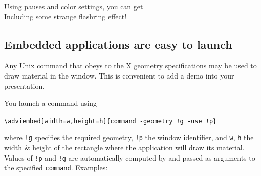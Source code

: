 \documentclass[12pt]{article}
\begin{document}
\noindent
Using pauses and color settings, you can get
\textcolor{red}{}\adviwait
{}
\textcolor{c2}{}\adviwait
{}
\textcolor{c3}{}\adviwait
{}
\textcolor{c4}{}\adviwait
{}
\textcolor{c5}{}\adviwait
{}
\textcolor{c6}{}\adviwait
{}\\
\textcolor{red}{}\adviwait
Including some strange flashring effect!
\textcolor{c6}{}\adviwait[\smallpause]%
\textcolor{c1}{}\adviwait[\smallpause]%
\textcolor{c2}{}\adviwait[\smallpause]%
\textcolor{c3}{}\adviwait[\smallpause]%
\textcolor{c4}{}\adviwait[\smallpause]%
\textcolor{c5}{}\adviwait[\smallpause]%
\textcolor{c6}{}\adviwait[\smallpause]%
\textcolor{c1}{}\adviwait[\smallpause]%
\textcolor{c2}{}\adviwait[\smallpause]%
\textcolor{c3}{}\adviwait[\smallpause]%
\textcolor{c4}{}\adviwait[\smallpause]%
\textcolor{c5}{}\adviwait[\smallpause]%
\textcolor{c6}{}\adviwait[\smallpause]%


\newpage

\subsection* {Embedded applications are easy to launch}

Any Unix command that obeys to the X geometry specifications may be
used to draw material in the {\ActiveDVI} window.
This is convenient to add a demo into your presentation.

\bigskip

\noindent
You launch a command using

\verb+\adviembed[width=w,height=h]{command -geometry !g -use !p}+

\noindent
where \verb"!g" specifies the required geometry, \verb"!p" the
{\ActiveDVI} window identifier, and \verb"w", \verb"h" the width \&
height of the rectangle where the application will draw its material.
Values of \verb"!p" and \verb"!g" are automatically computed by
{\ActiveDVI} and passed as arguments to the specified \verb"command".
 Examples:
\end{document}
